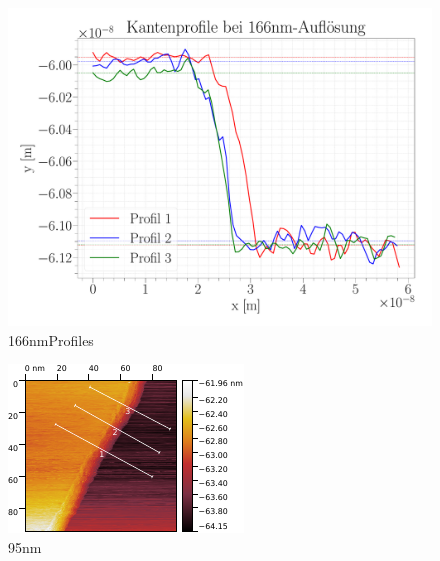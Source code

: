 \begin{figure}[H]
\centering
\includegraphics[width=\textwidth]{../Figures/166nm_profiles.pdf}
\caption{166nmProfiles}
\label{166nmProfiles}
\end{figure}

\begin{figure}[H]
\centering
\includegraphics[width=\textwidth]{../Gwyddion/HOPG/95nm.pdf}
\caption{95nm}
\label{95nm}
\end{figure}

